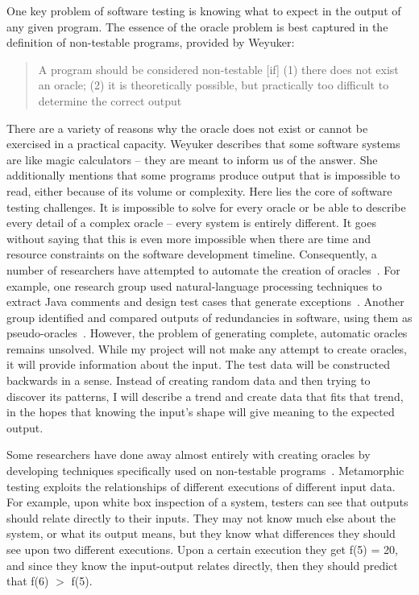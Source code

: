 One key problem of software testing is knowing what to expect in the output of any given program. The essence of the oracle problem is best captured in the definition of non-testable programs, provided by Weyuker:
\begin{quote}
A program should be considered non-testable [if] (1) there does not exist an oracle; (2) it is theoretically possible, but practically too difficult to determine the correct output~\cite{Chays:2000:FTD:347636.348954}
\end{quote}
There are a variety of reasons why the oracle does not exist or cannot be exercised in a practical capacity. Weyuker describes that some software systems are like magic calculators – they are meant to inform us of the answer. She additionally mentions that some programs produce output that is impossible to read, either because of its volume or complexity. Here lies the core of software testing challenges. It is impossible to solve for every oracle or be able to describe every detail of a complex oracle – every system is entirely different. It goes without saying that this is even more impossible when there are time and resource constraints on the software development timeline. Consequently, a number of researchers have attempted to automate the creation of oracles~\cite{6963470}. For example, one research group used natural-language processing techniques to extract Java comments and design test cases that generate exceptions~\cite{Goffi:2016:AGO:2931037.2931061}. Another group identified and compared outputs of redundancies in software, using them as pseudo-oracles~\cite{Carzaniga:2014:COI:2568225.2568287}. However, the problem of generating complete, automatic oracles remains unsolved. While my project will not make any attempt to create oracles, it will provide information about the input. The test data will be constructed backwards in a sense. Instead of creating random data and then trying to discover its patterns, I will describe a trend and create data that fits that trend, in the hopes that knowing the input's shape will give meaning to the expected output.

Some researchers have done away almost entirely with creating oracles by developing techniques specifically used on non-testable programs~\cite{Lindvall:2017:MMT:3103620.3103632,Segura:2017:TAD:3103620.3103626,Chen:2015:MTS:2819261.2819278,Chen:2016:SOC:2970276.2970366,Lindvall:2015:MMT:2819009.2819030}. Metamorphic testing exploits the relationships of different executions of different input data. For example, upon white box inspection of a system, testers can see that outputs should relate directly to their inputs. They may not know much else about the system, or what its output means, but they know what differences they should see upon two different executions. Upon a certain execution they get f(5) = 20, and since they know the input-output relates directly, then they should predict that f(6) $>$ f(5). 

